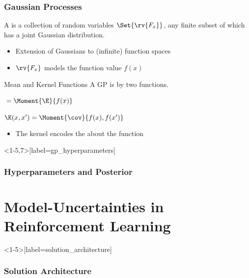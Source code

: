 \begin{frame}[label=gp_definition]
    \frametitle{Gaussian Processes}

    \begin{definition}
        A  is a collection of random variables $\Set{\rv{F_x}}$, any finite subset of which has a joint Gaussian distribution.
    \end{definition}
    \begin{itemize}
        \item Extension of Gaussians to (infinite) function spaces
        \item $\rv{F_x}$ models the function value $f(x)$
    \end{itemize}
    \vfill
    \pause
    \begin{block}{Mean and Kernel Functions}
        A GP is  by two functions.
        \medskip
        \begin{description}
            \item[Mean function] ${} = \Moment{\E}{f(x)}$
            \smallskip
            \item[Kernel function] $\K(x, x^\prime) = \Moment{\cov}{f(x), f(x^\prime)}$
        \end{description}
    \end{block}
    \begin{itemize}
        \item The kernel encodes the  about the function
    \end{itemize}
\end{frame}

\begin{frame}<1-5,7>[label=gp_hyperparameters]
    \frametitle{Hyperparameters and Posterior}

    \centering
\end{frame}

\section{Model-Uncertainties in Reinforcement Learning}
\begin{frame}<1-5>[label=solution_architecture]
    \frametitle{Solution Architecture}

    \centering
    
\end{frame}

